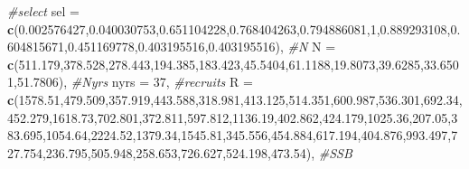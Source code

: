 \documentclass[]{article}
\newenvironment{Shaded}{\begin{snugshade}}{\end{snugshade}}
\newcommand{\CommentTok}[1]{\textcolor[rgb]{0.56,0.35,0.01}{\textit{#1}}}
\newcommand{\DataTypeTok}[1]{\textcolor[rgb]{0.13,0.29,0.53}{#1}}
\newcommand{\DecValTok}[1]{\textcolor[rgb]{0.00,0.00,0.81}{#1}}
\newcommand{\FloatTok}[1]{\textcolor[rgb]{0.00,0.00,0.81}{#1}}
\newcommand{\KeywordTok}[1]{\textcolor[rgb]{0.13,0.29,0.53}{\textbf{#1}}}
\newcommand{\NormalTok}[1]{#1}
\begin{document}
\begin{Shaded}
\begin{Highlighting}[]
    \CommentTok{\#select}
    \DataTypeTok{sel =} \KeywordTok{c}\NormalTok{(}\FloatTok{0.002576427}\NormalTok{,}\FloatTok{0.040030753}\NormalTok{,}\FloatTok{0.651104228}\NormalTok{,}\FloatTok{0.768404263}\NormalTok{,}\FloatTok{0.794886081}\NormalTok{,}\DecValTok{1}\NormalTok{,}\FloatTok{0.889293108}\NormalTok{,}\FloatTok{0.604815671}\NormalTok{,}\FloatTok{0.451169778}\NormalTok{,}\FloatTok{0.403195516}\NormalTok{,}\FloatTok{0.403195516}\NormalTok{),}
    \CommentTok{\#N}
    \DataTypeTok{N   =} \KeywordTok{c}\NormalTok{(}\FloatTok{511.179}\NormalTok{,}\FloatTok{378.528}\NormalTok{,}\FloatTok{278.443}\NormalTok{,}\FloatTok{194.385}\NormalTok{,}\FloatTok{183.423}\NormalTok{,}\FloatTok{45.5404}\NormalTok{,}\FloatTok{61.1188}\NormalTok{,}\FloatTok{19.8073}\NormalTok{,}\FloatTok{39.6285}\NormalTok{,}\FloatTok{33.6501}\NormalTok{,}\FloatTok{51.7806}\NormalTok{),}
    \CommentTok{\#Nyrs}
    \DataTypeTok{nyrs =} \DecValTok{37}\NormalTok{,}
    \CommentTok{\#recruits}
    \DataTypeTok{R    =} \KeywordTok{c}\NormalTok{(}\FloatTok{1578.51}\NormalTok{,}\FloatTok{479.509}\NormalTok{,}\FloatTok{357.919}\NormalTok{,}\FloatTok{443.588}\NormalTok{,}\FloatTok{318.981}\NormalTok{,}\FloatTok{413.125}\NormalTok{,}\FloatTok{514.351}\NormalTok{,}\FloatTok{600.987}\NormalTok{,}\FloatTok{536.301}\NormalTok{,}\FloatTok{692.34}\NormalTok{,}\FloatTok{452.279}\NormalTok{,}\FloatTok{1618.73}\NormalTok{,}\FloatTok{702.801}\NormalTok{,}\FloatTok{372.811}\NormalTok{,}\FloatTok{597.812}\NormalTok{,}\FloatTok{1136.19}\NormalTok{,}\FloatTok{402.862}\NormalTok{,}\FloatTok{424.179}\NormalTok{,}\FloatTok{1025.36}\NormalTok{,}\FloatTok{207.05}\NormalTok{,}\FloatTok{383.695}\NormalTok{,}\FloatTok{1054.64}\NormalTok{,}\FloatTok{2224.52}\NormalTok{,}\FloatTok{1379.34}\NormalTok{,}\FloatTok{1545.81}\NormalTok{,}\FloatTok{345.556}\NormalTok{,}\FloatTok{454.884}\NormalTok{,}\FloatTok{617.194}\NormalTok{,}\FloatTok{404.876}\NormalTok{,}\FloatTok{993.497}\NormalTok{,}\FloatTok{727.754}\NormalTok{,}\FloatTok{236.795}\NormalTok{,}\FloatTok{505.948}\NormalTok{,}\FloatTok{258.653}\NormalTok{,}\FloatTok{726.627}\NormalTok{,}\FloatTok{524.198}\NormalTok{,}\FloatTok{473.54}\NormalTok{),}
    \CommentTok{\#SSB }

\end{Highlighting}
\end{Shaded}
\end{document}
